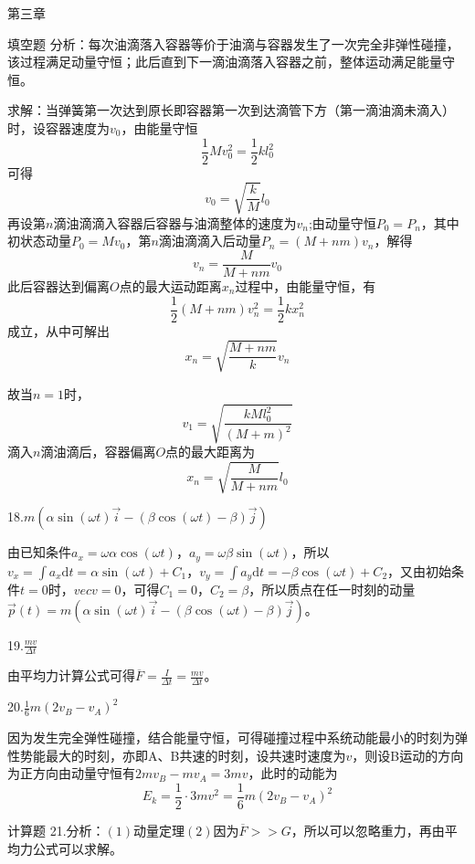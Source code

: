 \documentclass[a4paper,fleqn,twocolumn]{ctexart}
\newcommand{\di}[1]{\mathrm{d}#1}
\begin{document}
\begin{section}{第三章}
\begin{subsection}{填空题}
分析：每次油滴落入容器等价于油滴与容器发生了一次完全非弹性碰撞，该过程满足动量守恒；此后直到下一滴油滴落入容器之前，整体运动满足能量守恒。

求解：当弹簧第一次达到原长即容器第一次到达滴管下方（第一滴油滴未滴入）时，设容器速度为$v_0$，由能量守恒
\begin{equation*}
\frac{1}{2}Mv_0^2=\frac{1}{2}kl_0^2
\end{equation*}
可得
\begin{equation*}
v_0=\sqrt{\frac{k}{M}}l_0
\end{equation*}
再设第$n$滴油滴滴入容器后容器与油滴整体的速度为$v_n$;由动量守恒$P_0=P_n$，其中初状态动量$P_0=Mv_0$，第$n$滴油滴滴入后动量$P_n=(M+nm)v_n$，解得
\begin{equation*}
v_n=\frac{M}{M+nm}v_0
\end{equation*}
此后容器达到偏离$O$点的最大运动距离$x_n$过程中，由能量守恒，有
\begin{equation*}
\frac{1}{2}(M+nm)v_n^2=\frac{1}{2}kx_n^2
\end{equation*}
成立，从中可解出
\begin{equation*}
x_n=\sqrt{\frac{M+nm}{k}}v_n
\end{equation*}

故当$n=1$时，
\begin{equation*}
v_1=\sqrt{\frac{kMl_0^2}{(M+m)^2}}
\end{equation*}
滴入$n$滴油滴后，容器偏离$O$点的最大距离为
\begin{equation*}
x_n=\sqrt{\frac{M}{M+nm}}l_0
\end{equation*}

18.$m(\alpha\sin(\omega t)\vec{i}-(\beta\cos(\omega t)-\beta)\vec{j})$

由已知条件$a_x=\omega\alpha\cos(\omega t)，a_y=\omega\beta\sin(\omega t)$，所以$v_x=\int a_x\di t=\alpha\sin(\omega t)+C_1，v_y=\int a_y\di t=-\beta\cos(\omega t)+C_2$，又由初始条件$t=0$时，$vec{v}=0$，可得$C_1=0，C_2=\beta$，所以质点在任一时刻的动量$\vec{p}(t)=m(\alpha\sin(\omega t)\vec{i}-(\beta\cos(\omega t)-\beta)\vec{j})$。

19.$\frac{mv}{\Delta t}$

由平均力计算公式可得$\overline{F}=\frac{I}{\Delta t}=\frac{mv}{\Delta t}$。

20.$\frac{1}{6}m(2v_B-v_A)^2$

因为发生完全弹性碰撞，结合能量守恒，可得碰撞过程中系统动能最小的时刻为弹性势能最大的时刻，亦即A、B共速的时刻，设共速时速度为$v$，则设B运动的方向为正方向由动量守恒有$2mv_B-mv_A=3mv$，此时的动能为
\begin{equation*}
E_k=\frac{1}{2}\cdot 3mv^2=\frac{1}{6}m(2v_B-v_A)^2
\end{equation*}
\end{subsection}
\begin{subsection}{计算题}
21.分析：$(1)$动量定理$(2)$因为$\overline{F}>>G$，所以可以忽略重力，再由平均力公式可以求解。


\end{subsection}
\end{section}
\end{document}
